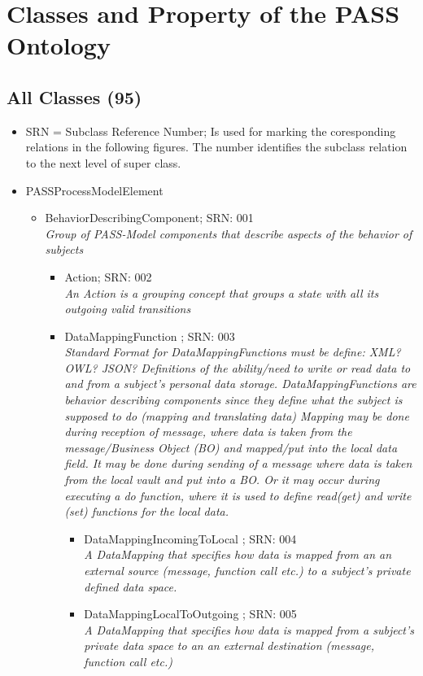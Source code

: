 \appendix
\chapter{Classes and Property of the PASS Ontology}

\section{All Classes (95)}

\begin{itemize}
\item SRN = Subclass Reference Number; Is used for marking the coresponding relations in the following figures. The number identifies the subclass relation to the next level of super class.
\item PASSProcessModelElement
\begin{itemize}
	\item BehaviorDescribingComponent; SRN: 001 \\  \textit{Group of PASS-Model components that describe aspects of the behavior of subjects}
	\begin{itemize}
		\item Action; SRN: 002 \\ \textit{An Action is a grouping concept that groups a state with all its outgoing valid transitions}
		\item DataMappingFunction ; SRN: 003 \\ \textit{Standard Format for DataMappingFunctions must be define: XML? OWL? JSON? 
		Definitions of the ability/need to write or read data to and from a subject's personal data storage.
		DataMappingFunctions are behavior describing components since they define what the subject is supposed to do (mapping and translating data)
		Mapping may be done during reception of message, where data is taken from the message/Business Object (BO) and mapped/put into the local data field.
		It may be done during sending of a message where data is taken from the local vault and put into a BO.
		Or it may occur during executing a do function, where it is used to define read(get) and write (set) functions for the local data.}
		\begin{itemize}
			\item DataMappingIncomingToLocal ; SRN: 004 \\ \textit{A DataMapping that specifies how data is mapped from an an external source (message, function call etc.) to a subject's private defined data space.}
			\item DataMappingLocalToOutgoing ; SRN: 005 \\ \textit{A DataMapping that specifies how data is mapped from a subject's private data space to an an external destination (message, function call etc.)}

\end{itemize}
\end{itemize}
\end{itemize}
\end{itemize}
